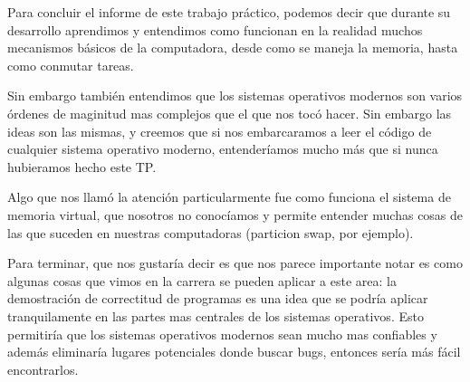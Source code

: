 Para concluir el informe de este trabajo práctico, podemos decir que durante su desarrollo aprendimos y entendimos como funcionan en la realidad muchos mecanismos básicos de la computadora, desde como se maneja la memoria, hasta como conmutar tareas.

Sin embargo también entendimos que los sistemas operativos modernos son varios órdenes de maginitud mas complejos que el que nos tocó hacer. Sin embargo las ideas son las mismas, y creemos que si nos embarcaramos a leer el código de cualquier sistema operativo moderno, entenderíamos mucho más que si nunca hubieramos hecho este TP.

Algo que nos llamó la atención particularmente fue como funciona el sistema de memoria virtual, que nosotros no conocíamos y permite entender muchas cosas de las que suceden en nuestras computadoras (particion swap, por ejemplo).

Para terminar, que nos gustaría decir es que nos parece importante notar es como algunas cosas que vimos en la carrera se pueden aplicar a este area: la demostración de correctitud de programas es una idea que se podría aplicar tranquilamente en las partes mas centrales de los sistemas operativos. Esto permitiría que los sistemas operativos modernos sean mucho mas confiables y además eliminaría lugares potenciales donde buscar bugs, entonces sería más fácil
encontrarlos.



